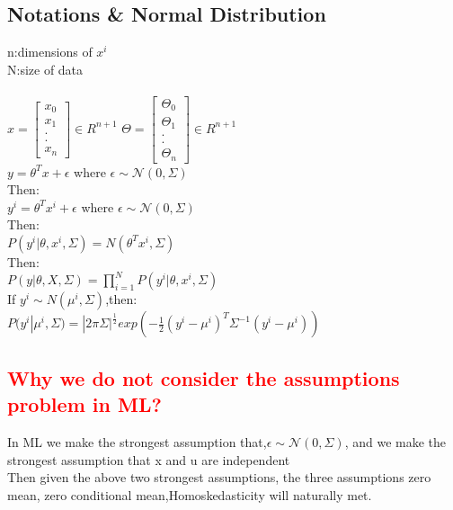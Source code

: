 \documentclass[a4paper,10pt]{article}
\newcommand{\red}[1]{\textcolor{red}{#1}}
\begin{document}
\subsection{Notations \& Normal Distribution}
n:dimensions of $x^{i}$\\
N:size of data\\
\\
$ x =\left[ \begin{array}{c} x_{0} \\ x_{1} \\ .\\.\\ x_{n} \end{array} \right] \in R^{n+1}$
$ \Theta =\left[ \begin{array}{c} \Theta_{0} \\ \Theta_{1} \\ .\\.\\ \Theta_{n} \end{array} \right] \in R^{n+1}$\\
$y = \theta^{T}x +\epsilon$ where $\epsilon \sim \mathcal{N}(0,\Sigma)$\\
Then:\\
$y^{i} = \theta^{T}x^{i} +\epsilon$ where $\epsilon \sim \mathcal{N}(0,\Sigma)$\\
Then:\\
$P(y^{i}|\theta,x^{i},\Sigma)=N(\theta^{T}x^{i},\Sigma)$\\
Then:\\
$P(y|\theta,X,\Sigma) = \prod_{i=1}^{N} P(y^{i}|\theta,x^{i},\Sigma)$\\


If $y^{i} \sim N(\mu^{i},\Sigma)$,then:\\
$P(y^{i}|\mu^{i},\Sigma)=|2\pi\Sigma|^{\frac{1}{2}}exp(-\frac{1}{2}(y^{i}-\mu^{i})^{T}\Sigma^{-1}(y^{i}-\mu^{i}) )$\\

\subsection{\red{Why we do not consider the assumptions problem in ML?}}
In ML we make the strongest assumption that,$\epsilon \sim \mathcal{N}(0,\Sigma)$, and we make the strongest assumption that x and u are independent\\

Then given the above two strongest assumptions, the three assumptions zero mean, zero conditional mean,Homoskedasticity will naturally met.\\
\end{document}
